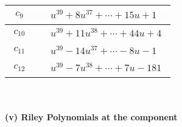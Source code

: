 \documentclass[1p]{elsarticle_modified}
\theoremstyle{definition}
\begin{document}
\begin{tabular}{m{50pt}|m{274pt}}
\hline $$\begin{aligned}c_{9}\end{aligned}$$&$\begin{aligned}
&u^{39}+8 u^{37}+\cdots+15 u+1
\end{aligned}$\\
\hline $$\begin{aligned}c_{10}\end{aligned}$$&$\begin{aligned}
&u^{39}+11 u^{38}+\cdots+44 u+4
\end{aligned}$\\
\hline $$\begin{aligned}c_{11}\end{aligned}$$&$\begin{aligned}
&u^{39}-14 u^{37}+\cdots-8 u-1
\end{aligned}$\\
\hline $$\begin{aligned}c_{12}\end{aligned}$$&$\begin{aligned}
&u^{39}-7 u^{38}+\cdots+7 u-181
\end{aligned}$\\
\hline
\end{tabular}\\~\\
\newpage\renewcommand{\arraystretch}{1}
\flushleft \textbf{(v) Riley Polynomials at the component}\newline \\
\end{document}
